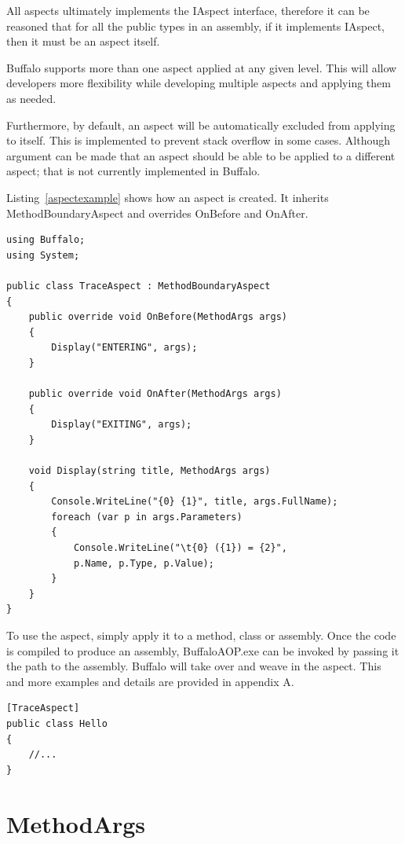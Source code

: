 All aspects ultimately implements the IAspect interface, therefore it can be reasoned that for all the public types in an assembly, if it implements IAspect, then it must be an aspect itself.

Buffalo supports more than one aspect applied at any given level. This will allow developers more flexibility while developing multiple aspects and applying them as needed.

Furthermore, by default, an aspect will be automatically excluded from applying to itself. This is implemented to prevent stack overflow in some cases. Although argument can be made that an aspect should be able to be applied to a different aspect; that is not currently implemented in Buffalo.

Listing~\ref{aspectexample} shows how an aspect is created. It inherits MethodBoundaryAspect and overrides OnBefore and OnAfter.

\begin{lstlisting}[caption={Sample TraceAspect}, label=aspectexample]
using Buffalo;
using System;

public class TraceAspect : MethodBoundaryAspect
{
    public override void OnBefore(MethodArgs args)
    {
        Display("ENTERING", args);
    }

    public override void OnAfter(MethodArgs args)
    {
        Display("EXITING", args);
    }

    void Display(string title, MethodArgs args)
    {
        Console.WriteLine("{0} {1}", title, args.FullName);
        foreach (var p in args.Parameters)
        {
            Console.WriteLine("\t{0} ({1}) = {2}", 
			p.Name, p.Type, p.Value);
        }
    }
}
\end{lstlisting}

To use the aspect, simply apply it to a method, class or assembly. Once the code is compiled to produce an assembly, BuffaloAOP.exe can be invoked by passing it the path to the assembly. Buffalo will take over and weave in the aspect. This and more examples and details are provided in appendix A.

\begin{lstlisting}[caption={Apply Aspect on Class Level}, label=helloaspect]
[TraceAspect]
public class Hello
{
	//...
}
\end{lstlisting}

\section{MethodArgs}

